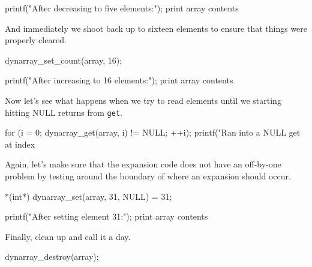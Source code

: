 printf("After decreasing to five elements:");
\LA{}print array contents~{\nwtagstyle{}}\RA{}
\nwendcode{}\nwdocspar

And immediately we shoot back up to sixteen elements to ensure
that things were properly cleared.

\nwenddocs{}\plusendmoddef
dynarray_set_count(array, 16);

printf("After increasing to 16 elements:");
\LA{}print array contents~{\nwtagstyle{}}\RA{}
\nwendcode{}\nwdocspar

Now let's see what happens when we try to read elements until we
starting hitting NULL returns from {\tt{}get}.

\nwenddocs{}\plusendmoddef
for (i = 0; dynarray_get(array, i) != NULL; ++i);
printf("Ran into a NULL get at index %
\nwendcode{}\nwdocspar

Again, let's make sure that the expansion code does not have an
off-by-one problem by testing around the boundary of where an expansion
should occur.

\nwenddocs{}\plusendmoddef
*(int*) dynarray_set(array, 31, NULL) = 31;

printf("After setting element 31:");
\LA{}print array contents~{\nwtagstyle{}}\RA{}
\nwendcode{}\nwdocspar

Finally, clean up and call it a day.

\nwenddocs{}\plusendmoddef
dynarray_destroy(array);
\nwendcode{}

